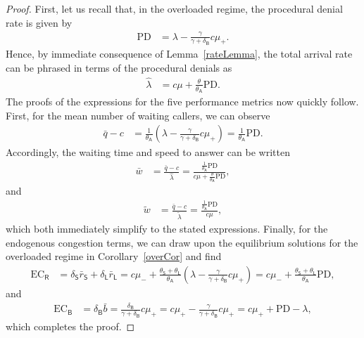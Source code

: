 \documentclass[manuscript,screen,authorversion]{acmart}
\begin{document}
\begin{proof}
First, let us recall that, in the overloaded regime, the procedural denial rate is given by
\begin{align}
\mathrm{PD}
&=
\lambda - \frac{\gamma}{\gamma + \delta_\mathsf{B}} c\mu_+
.
\end{align}
Hence, by immediate consequence of Lemma~\ref{rateLemma}, the total arrival rate can be phrased in terms of the procedural denials as
\begin{align}
\hat \lambda 
&=
c\mu + \frac{\theta}{\theta_\mathsf{A}} \mathrm{PD}
.
\end{align}
The proofs of the expressions for the five performance metrics now quickly follow. First, for the mean number of waiting callers, we can observe
\begin{align}
\bar q - c
&=
\frac{1}{\theta_\mathsf{A}}
\left(
\lambda - \frac{\gamma}{\gamma + \delta_\mathsf{B}}c\mu_+
\right)
=
\frac{1}{\theta_\mathsf{A}}\mathrm{PD}
.
\end{align}
Accordingly, the waiting time and speed to answer can be written
\begin{align}
\bar w 
&=
\frac{\bar q - c}{\hat \lambda}
=
\frac{\frac{1}{\theta_\mathsf{A}}\mathrm{PD}}
{c\mu + \frac{\theta}{\theta_\mathsf{A}}\mathrm{PD}}
,
\end{align}
and
\begin{align}
\tilde w
&=
\frac{\bar q - c}{\tilde \lambda}
=
\frac{\frac{1}{\theta_\mathsf{A}}\mathrm{PD}}{c\mu}
,
\end{align}
which both immediately simplify to the stated expressions. 
Finally, for the endogenous congestion terms, we can draw upon the equilibrium solutions for the overloaded regime in Corollary~\ref{overCor} and find
\begin{align}
\mathrm{EC}_\mathsf{R}
&=
\delta_\mathsf{S}\bar r_\mathsf{S} + \delta_\mathsf{L}\bar r_\mathsf{L}
=
c\mu_-
+ 
\frac{\theta_\mathsf{S} + \theta_\mathsf{L}}{\theta_\mathsf{A}}\left( \lambda - \frac{\gamma}{\gamma + \delta_\mathsf{B}}c\mu_+\right)
=
c\mu_-
+ 
\frac{\theta_\mathsf{S} + \theta_\mathsf{L}}{\theta_\mathsf{A}}
\mathrm{PD}
,
\end{align}
and
\begin{align}
\mathrm{EC}_\mathsf{B}
&=
\delta_\mathsf{B}\bar b
=
\frac{\delta_\mathsf{B}}{\gamma + \delta_\mathsf{B}} c\mu_+
=
c\mu_+
-
\frac{\gamma}{\gamma + \delta_\mathsf{B}}
c\mu_+
=
c\mu_+
+
\mathrm{PD}
-
\lambda
,
\end{align}
which completes the proof.
\end{proof}
\end{document}

